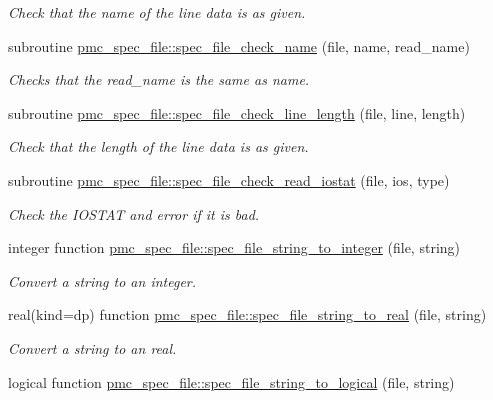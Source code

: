 \begin{DoxyCompactItemize}
\begin{DoxyCompactList}\small\item\em Check that the name of the line data is as given. \end{DoxyCompactList}\item 
subroutine \mbox{\hyperlink{namespacepmc__spec__file_adf9e4ee5ff71cbe408fea47ec1342414}{pmc\+\_\+spec\+\_\+file\+::spec\+\_\+file\+\_\+check\+\_\+name}} (file, name, read\+\_\+name)
\begin{DoxyCompactList}\small\item\em Checks that the read\+\_\+name is the same as name. \end{DoxyCompactList}\item 
subroutine \mbox{\hyperlink{namespacepmc__spec__file_a397be4f827824ae1c71b46d3f93060c1}{pmc\+\_\+spec\+\_\+file\+::spec\+\_\+file\+\_\+check\+\_\+line\+\_\+length}} (file, line, length)
\begin{DoxyCompactList}\small\item\em Check that the length of the line data is as given. \end{DoxyCompactList}\item 
subroutine \mbox{\hyperlink{namespacepmc__spec__file_ad019e654ad6a62c42f62af8ce5b1c0b8}{pmc\+\_\+spec\+\_\+file\+::spec\+\_\+file\+\_\+check\+\_\+read\+\_\+iostat}} (file, ios, type)
\begin{DoxyCompactList}\small\item\em Check the I\+O\+S\+T\+AT and error if it is bad. \end{DoxyCompactList}\item 
integer function \mbox{\hyperlink{namespacepmc__spec__file_a1c773de3382d01f1bd47ede8e0e78717}{pmc\+\_\+spec\+\_\+file\+::spec\+\_\+file\+\_\+string\+\_\+to\+\_\+integer}} (file, string)
\begin{DoxyCompactList}\small\item\em Convert a string to an integer. \end{DoxyCompactList}\item 
real(kind=dp) function \mbox{\hyperlink{namespacepmc__spec__file_aa9a3ea2d69a3e47a827dc9b91baa559a}{pmc\+\_\+spec\+\_\+file\+::spec\+\_\+file\+\_\+string\+\_\+to\+\_\+real}} (file, string)
\begin{DoxyCompactList}\small\item\em Convert a string to an real. \end{DoxyCompactList}\item 
logical function \mbox{\hyperlink{namespacepmc__spec__file_a3e48df131612d60a35f57a85ae708089}{pmc\+\_\+spec\+\_\+file\+::spec\+\_\+file\+\_\+string\+\_\+to\+\_\+logical}} (file, string)

\end{DoxyCompactItemize}

